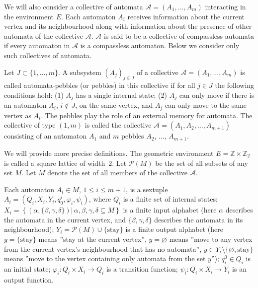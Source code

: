 \documentclass{article}
\begin{document}
We will also consider a collective of automata $\mathcal{A} = \left( A_{1}, \dots, A_{m} \right)$ interacting in the environment $E$.
Each automaton $A_{i}$ receives information about the current vertex and its neighbourhood along with information about the presence of other automata of the collective $\mathcal{A}$.
$\mathcal{A}$ is said to be a collective of compassless automata if every automaton in $\mathcal{A}$ is a compassless automaton. 
Below we consider only such collectives of automata.

Let $J \subset \{ 1, \dots, m \}$.
A subsystem $\left( A_{j} \right)_{j \in J}$ of a collective $\mathcal{A} = \left( A_{1}, \dots, A_{m} \right)$ is called automata-pebbles (or pebbles) in this collective if for all $j \in J$ the following conditions hold: (1) $A_{j}$ has a single internal state; (2) $A_{j}$ can only move if there is an automaton $A_{i}$, $i \not\in J$, on the same vertex, and $A_{j}$ can only move to the same vertex as $A_{i}$.
The pebbles play the role of an external memory for automata.
The collective of type $(1, m)$ is called the collective $\mathcal{A} = \left( A_{1}, A_{2}, \dots, A_{m+1} \right)$ consisting of an automaton $A_1$ and $m$ pebbles $A_{2}$, ..., $A_{m+1}$.

We will provide more precise definitions.
The geometric environment $E = \mathbb{Z} \times \mathbb{Z}_{2}$ is called a square lattice of width~$2$.
Let $\mathcal{P}(M)$ be the set of all subsets of any set $M$.
Let $M$ denote the set of all members of the collective $\mathcal{A}$.

Each automaton $A_{i} \in M$, $1 \leq i \leq m+1$, is a sextuple $A_{i} = \left( Q_{i}, X_{i}, Y_{i}, q^{i}_{0}, \varphi_{i}, \psi_{i} \right)$, where 
$Q_{i}$ is a finite set of internal states; 
$X_{i} = \left\{ \left( \alpha, \{ \beta, \gamma, \delta \} \right) \vert\, \alpha, \beta, \gamma, \delta \subseteq M \right\}$ is a finite input alphabet (here $\alpha$ describes the automata in the current vertex, and $\{ \beta, \gamma, \delta \}$ describes the automata in its neighbourhood);
$Y_{i} = \mathcal{P}(M) \cup \{ \mathrm{stay} \}$ is a finite output alphabet (here $y = \{ \mathrm{stay} \}$ means ''stay at the current vertex'', $y = \varnothing$ means ''move to any vertex from the current vertex's neighbourhood that has no automata'', $y \in Y_{i} \setminus \{ \varnothing, \mathrm{stay} \}$ means ''move to the vertex containing only automata from the set $y$'');
$q^{0}_{i} \in Q_{i}$ is an initial state; 
$\varphi_{i} : Q_{i} \times X_{i} \to Q_{i}$ is a transition function;
$\psi_{i} : Q_{i} \times X_{i} \to Y_{i}$ is an output function.
\end{document}

